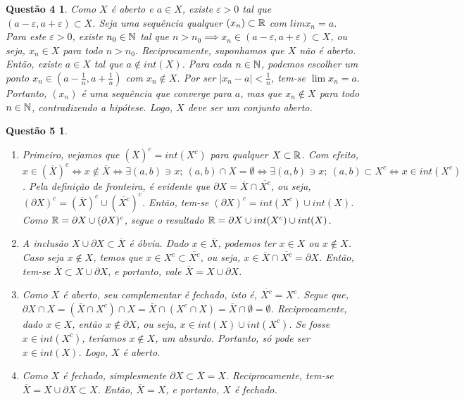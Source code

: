 \documentclass[a4paper,12pt]{article}
\newtheorem*{4}{Questão 4}
\newtheorem*{5}{Questão 5}
\begin{document}
\begin{4}
	
	Como $X$ é aberto e $a \in X$, existe $\varepsilon > 0$ tal que $(a-\varepsilon,a+\varepsilon) \subset X$. Seja uma sequência qualquer $(x_n) \subset \Bbb R$ com $limx_n = a$. Para este $\varepsilon > 0$, existe $n_0 \in \Bbb N$ tal que $n > n_0 \implies x_n \in (a-\varepsilon,a+\varepsilon) \subset X$, ou seja, $x_n \in X$ para todo $n > n_0$. Reciprocamente, suponhamos que $X$ não é aberto. Então, existe $a \in X$ tal que $a \notin int(X)$. Para cada $n \in \Bbb N$, podemos escolher um ponto $x_n \in (a - \frac{1}{n}, a+\frac{1}{n})$ com $x_n \notin X$. Por ser $|x_n - a| < \frac{1}{n}$, tem-se $\lim x_n = a$. Portanto, $(x_n)$ é uma sequência que converge para $a$, mas que $x_n \notin X$ para todo $n \in \Bbb N$, contradizendo a hipótese. Logo, $X$ deve ser um conjunto aberto.

\end{4}

\begin{5}

	\begin{enumerate}[label=(\alph*)]
		
		\item Primeiro, vejamos que $(\overline{X})^c = int(X^c)$ para qualquer $X \subset \Bbb R$. Com efeito, 
		$x \in (\overline{X})^c \iff x \notin \overline{X} \iff \exists(a,b) \ni x; \ (a,b) \cap X = \emptyset \iff \exists (a,b) \ni x; \ (a,b) \subset X^c \iff x \in int(X^c)$.
		Pela definição de fronteira, é evidente que $\partial X = \overline{X} \cap \overline{X^c}$, ou seja, $(\partial X)^c = (\overline{X})^c \cup (\overline{X^c})^c$. Então, tem-se $(\partial X)^c = int(X^c) \cup int(X)$. Como $\Bbb R = \partial X \cup (\partial X)^c$, segue o resultado $\Bbb R = \partial X \cup int(X^c) \cup int(X)$.
		
		
		\item A inclusão $X \cup \partial X \subset \overline{X}$ é óbvia. Dado $x \in \overline{X}$, podemos ter $x \in X$ ou $x \notin X$. Caso seja $x \notin X$, temos que $x \in X^c \subset \overline{X^c}$, ou seja, $x \in \overline{X} \cap \overline{X^c} = \partial X$. Então, tem-se $\overline{X} \subset X \cup \partial X$, e portanto, vale $\overline{X} = X \cup \partial X$.
		
		\item Como $X$ é aberto, seu complementar é fechado, isto é, $\overline{X^c} = X^c$. Segue que, $\partial X \cap X = (\overline{X} \cap X^c) \cap X = \overline{X} \cap (X^c \cap X) = \overline{X} \cap \emptyset = \emptyset$. Reciprocamente, dado $x \in X$, então $x \notin \partial X$, ou seja, $x \in int(X) \cup int(X^c)$. Se fosse $x \in int(X^c)$, teríamos $x \notin X$, um absurdo. Portanto, só pode ser $x \in int(X)$. Logo, $X$ é aberto.
		
		\item Como $X$ é fechado, simplesmente $\partial X \subset \overline{X} = X$. Reciprocamente, tem-se $\overline{X} = X \cup \partial X \subset X$. Então, $\overline{X} = X$, e portanto, $X$ é fechado.
		
	\end{enumerate}

\end{5}
\end{document}
